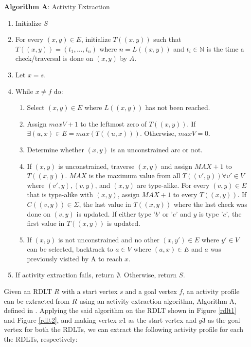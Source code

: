 \documentclass[12pt]{article}
\begin{document}
        \textbf{Algorithm A}: Activity Extraction \cite{malinao-rdlt}
        \begin{enumerate}
            \item Initialize $S$
            \item For every $(x,y) \in E$, initialize $T((x,y))$ such that $T((x,y)) = (t_{1},\ldots,t_{n})$ where $n = L((x,y))$ and $t_{i} \in \mathbb{N}$ is the time a check/traversal is done on $(x,y)$ by $A$.
            \item Let $x = s$.
            \item While $x \neq f$ do:
                \begin{enumerate}
                    \item Select $(x,y) \in E$ where $L((x,y))$ has not been reached.
                    \item Assign $maxV + 1$ to the leftmost zero of $T((x,y))$. If $\exists(u,x) \in E = max(T((u,x)))$. Otherwise, $maxV = 0$.
                    \item Determine whether $(x,y)$ is an unconstrained arc or not.
                    \item If $(x,y)$ is unconstrained, traverse $(x,y)$ and assign $MAX+1$ to $T((x,y))$. $MAX$ is the maximum value from all $T((v',y)) \forall v' \in V$ where $(v',y),(v,y)$, and $(x,y)$ are type-alike. For every $(v,y) \in E$ that is type-alike with $(x,y)$, assign $MAX+1$ to every $T((x,y))$. If $C((v,y)) \in \Sigma$, the last value in $T((x,y))$ where the last check was done on $(v,y)$ is updated. If either type '$b$' or '$e$' and $y$ is type '$c$', the first value in $T((x,y))$ is updated.
                    \item If $(x,y)$ is not unconstrained and no other $(x,y') \in E$ where $y' \in V$ can be selected, backtrack to $a \in V$ where $(a,x) \in E$ and $a$ was previously visited by A to reach $x$.
                \end{enumerate}
            \item If activity extraction fails, return $\emptyset$. Otherwise, return $S$.
        \end{enumerate}

        Given an RDLT $R$ with a start vertex $s$ and a goal vertex $f$, an activity profile can be extracted from $R$ using an activity extraction algorithm, Algorithm A, defined in \cite{malinao-rdlt}. Applying the said algorithm on the RDLT shown in Figure \ref{rdlt1} and Figure \ref{rdlt2}, and making vertex $x1$ as the start vertex and $y3$ as the goal vertex for both the RDLTs, we can extract the following activity profile for each the RDLTs, respectively:
\end{document}

